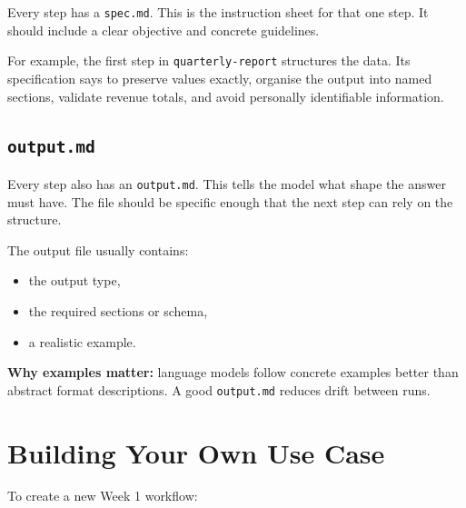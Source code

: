 \documentclass[12pt, a4paper]{article}
\begin{document}
Every step has a \texttt{spec.md}. This is the instruction sheet for that one step. It should include a clear objective and concrete guidelines.

For example, the first step in \texttt{quarterly-report} structures the data. Its specification says to preserve values exactly, organise the output into named sections, validate revenue totals, and avoid personally identifiable information.

\subsection{\texttt{output.md}}

Every step also has an \texttt{output.md}. This tells the model what shape the answer must have. The file should be specific enough that the next step can rely on the structure.

The output file usually contains:

\begin{itemize}[leftmargin=1.5em]
  \item the output type,
  \item the required sections or schema,
  \item a realistic example.
\end{itemize}

\begin{notebox}
\textbf{Why examples matter:} language models follow concrete examples better than abstract format descriptions. A good \texttt{output.md} reduces drift between runs.
\end{notebox}

\clearpage

\section{Building Your Own Use Case}

To create a new Week 1 workflow:
\end{document}
